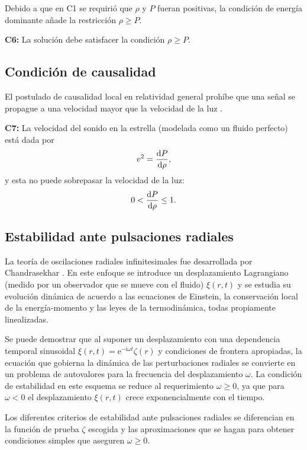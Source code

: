 Debido a que en C1 se requirió que $\rho$ y $P$ fueran positivas, la condición de energía dominante añade la restricción $\rho \geq P$.

\textbf{C6:} La solución debe satisfacer la condición $\rho \geq P$.

\subsection*{Condición de causalidad}
\noindent El postulado de causalidad local en relatividad general prohíbe que una señal se propague a una velocidad mayor que la velocidad de la luz \cite{Hawking1973}. 

\textbf{C7:}  La velocidad del sonido en la estrella (modelada como un fluido perfecto) está dada por 
\begin{equation}
    v^2=\dv{P}{\rho},
\end{equation}
y esta no puede sobrepasar la velocidad de la luz:
\begin{equation}
    0 < \dv{P}{\rho} \leq 1 .
\end{equation}

\subsection*{Estabilidad ante pulsaciones radiales}

\noindent La teoría de oscilaciones radiales infinitesimales fue desarrollada por Chandrasekhar \cite{Chandrasekhar1964a}. En este enfoque se introduce un desplazamiento Lagrangiano (medido por un observador que se mueve con el fluido) $\xi(r,t)$ y se estudia su evolución dinámica de acuerdo a las ecuaciones de Einstein, la conservación local de la energía-momento y las leyes de la termodinámica, todas propiamente linealizadas.

Se puede demostrar \cite{Chandrasekhar1964a,Misner1973} que al suponer un desplazamiento con una dependencia temporal sinusoidal $\xi(r, t)=\mathrm{e}^{-\mathrm{i} \omega t} \zeta(r)$  y condiciones de frontera apropiadas, la ecuación que gobierna la dinámica de las perturbaciones radiales se convierte en un problema de autovalores para la frecuencia del desplazamiento $\omega$. La condición de estabilidad en este esquema se reduce al requerimiento $\omega \geq 0$, ya que para $\omega<0$ el desplazamiento $\xi(r,t)$ crece exponencialmente con el tiempo.   

Los diferentes criterios de estabilidad ante pulsaciones radiales se diferencian en la función de prueba $\zeta$ escogida y las aproximaciones que se hagan para obtener condiciones simples que aseguren $\omega \geq 0$.



